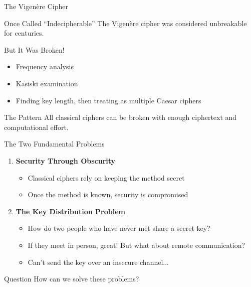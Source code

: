 \documentclass{beamer}
\begin{document}
\begin{frame}{The Vigenère Cipher}
\begin{block}{Once Called ``Indecipherable''}
The Vigenère cipher was considered unbreakable for centuries.
\end{block}

\pause

\begin{alertblock}{But It Was Broken!}
\begin{itemize}
    \item Frequency analysis
    \item Kasiski examination
    \item Finding key length, then treating as multiple Caesar ciphers
\end{itemize}
\end{alertblock}

\pause

\begin{block}{The Pattern}
All classical ciphers can be broken with enough ciphertext and computational effort.
\end{block}
\end{frame}

\begin{frame}{The Two Fundamental Problems}
\begin{enumerate}
    \item \textbf{Security Through Obscurity}
    \begin{itemize}
        \item Classical ciphers rely on keeping the method secret
        \item Once the method is known, security is compromised
    \end{itemize}
    
    \pause
    
    \item \textbf{The Key Distribution Problem}
    \begin{itemize}
        \item How do two people who have never met share a secret key?
        \item If they meet in person, great! But what about remote communication?
        \item Can't send the key over an insecure channel...
    \end{itemize}
\end{enumerate}

\pause

\begin{alertblock}{Question}
How can we solve these problems?
\end{alertblock}
\end{frame}
\end{document}
